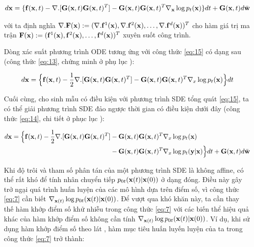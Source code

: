 \documentclass{article} %
\begin{document}
\begin{equation} \label{eq:16}
    d \bold{x} = \lbrace \bold{f}(\bold{x}, t) - \nabla . \lbrack \bold{G}(\bold{x}, t) \bold{G}(\bold{x}, t)^T \rbrack - \bold{G}(\bold{x}, t) \bold{G}(\bold{x}, t)^T \nabla_{\bold{x}} \log p_t(\bold{x}) \rbrace dt + \bold{G}(\bold{x}, t) d\bar{\bold{w}}
\end{equation}

với ta định nghĩa $\nabla . \bold{F}(\bold{x}) := (\nabla. \bold{f}^1 (\bold{x}), \nabla. \bold{f}^2 (\bold{x}), \dots, \nabla. \bold{f}^d (\bold{x}))^T$ cho hàm giá trị ma trận $\bold{F}(\bold{x}) := (\bold{f}^1 (\bold{x}), \bold{f}^2 (\bold{x}), \dots, \bold{f}^d (\bold{x}))^T$ xuyên suốt công trình.

Dòng xác suất phương trình ODE tương ứng với công thức \ref{eq:15} có dạng sau (công thức \ref{eq:13}, chứng minh ở phụ lục ):

\begin{equation} \label{eq:17}
    d \bold{x} = \Big \lbrace \bold{f}(\bold{x}, t) - \dfrac{1}{2} \nabla . \lbrack \bold{G}(\bold{x}, t) \bold{G}(\bold{x}, t)^T  \rbrack - \bold{G}(\bold{x}, t) \bold{G}(\bold{x}, t)^T \nabla_{x} \log p_t(\bold{x}) \Big \rbrace dt
\end{equation}

Cuối cùng, cho sinh mẫu có điều kiện với phương trình SDE tổng quát \ref{eq:15}, ta có thể giải phương trình SDE đảo ngược thời gian có điều kiện dưới đây (công thức \ref{eq:14}, chi tiết ở phục lục ):\

\begin{equation} \label{eq:18}
    \begin{aligned}
        d \bold{x} = \Big \lbrace \bold{f}(\bold{x}, t) - \dfrac{1}{2} \nabla . \lbrack \bold{G}(\bold{x}, t) \bold{G}(\bold{x}, t)^T  \rbrack &- \bold{G}(\bold{x}, t) \bold{G}(\bold{x}, t)^T \nabla_{x} \log p_t(\bold{x}) \\
        & -\bold{G}(\bold{x}, t) \bold{G}(\bold{x}, t)^T \nabla_{x} \log p_t(\bold{y} \vert \bold{x})  \Big \rbrace dt + \bold{G}(\bold{x}, t) d \bar{\bold{w}}
    \end{aligned}
\end{equation}

Khi độ trôi và tham số phân tán của một phương trình SDE là không affine, có thể rất khó để tính nhân chuyển tiếp $p_{0t}(\bold{x}(t) \vert \bold{x}(0))$ ở dạng đóng.
Điều này gây trở ngại quá trình huấn luyện của các mô hình dựa trên điểm số, vì công thức \ref{eq:7} cần biết $\nabla_{\bold{x}(t)} \log p_{0t} (\bold{x}(t) \vert \bold{x}(0))$.
Để vượt qua khó khăn này, ta cần thay thế hàm khớp điểm số khử nhiễu trong công thức \ref{eq:7} với các biến thể hiệu quả khác của hàm khớp điểm số không cần tính $\nabla_{\bold{x}(t)} \log p_{0t} (\bold{x}(t) \vert \bold{x}(0))$.
Ví dụ, khi sử dụng hàm khớp điểm số theo lát \citep{song2020sliced}, hàm mục tiêu huấn luyến luyện của ta trong công thức \ref{eq:7} trở thành:
\end{document}
